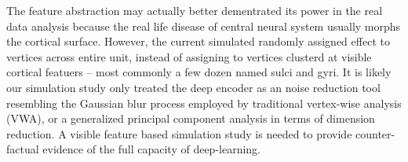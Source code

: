\documentclass[twocolumn]{article}
\begin{document}
The feature abstraction may actually better dementrated its power in the real data analysis because the real life disease of central neural system usually morphs the cortical surface. However, the current simulated randomly assigned effect to vertices across entire unit, instead of assigning to vertices clusterd at visible cortical featuers -- most commonly a few dozen named sulci and gyri. It is likely our simulation study only treated the deep encoder as an noise reduction tool resembling the Gaussian blur process employed by traditional vertex-wise analysis (VWA), or a generalized principal component analysis in terms of dimension reduction. A visible feature based simulation study is needed to provide counter-factual evidence of the full capacity of deep-learning.

\end{document}
